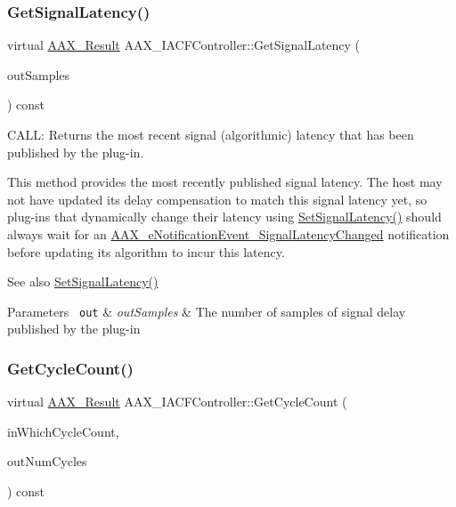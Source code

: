 \subsubsection{\texorpdfstring{GetSignalLatency()}{GetSignalLatency()}}
{\footnotesize\ttfamily virtual \mbox{\hyperlink{a00392_a4d8f69a697df7f70c3a8e9b8ee130d2f}{A\+A\+X\+\_\+\+Result}} A\+A\+X\+\_\+\+I\+A\+C\+F\+Controller\+::\+Get\+Signal\+Latency (\begin{DoxyParamCaption}\item[{int32\+\_\+t $\ast$}]{out\+Samples }\end{DoxyParamCaption}) const\hspace{0.3cm}{\ttfamily [pure virtual]}}



C\+A\+LL\+: Returns the most recent signal (algorithmic) latency that has been published by the plug-\/in. 

This method provides the most recently published signal latency. The host may not have updated its delay compensation to match this signal latency yet, so plug-\/ins that dynamically change their latency using \mbox{\hyperlink{a01789_af2c648879419d94971c1308d8698601f}{Set\+Signal\+Latency()}} should always wait for an \mbox{\hyperlink{a00491_afab5ea2cfd731fc8f163b6caa685406ea06ab4b075ecb523d0dde3ec19b76a756}{A\+A\+X\+\_\+e\+Notification\+Event\+\_\+\+Signal\+Latency\+Changed}} notification before updating its algorithm to incur this latency.

\begin{DoxySeeAlso}{See also}
\mbox{\hyperlink{a01789_af2c648879419d94971c1308d8698601f}{Set\+Signal\+Latency()}}
\end{DoxySeeAlso}

\begin{DoxyParams}[1]{Parameters}
\mbox{\texttt{ out}}  & {\em out\+Samples} & The number of samples of signal delay published by the plug-\/in \\
\hline
\end{DoxyParams}
\mbox{\label{a01637_a37c235cb6a27eab95686a009edeffabe}} 
\subsubsection{\texorpdfstring{GetCycleCount()}{GetCycleCount()}}
{\footnotesize\ttfamily virtual \mbox{\hyperlink{a00392_a4d8f69a697df7f70c3a8e9b8ee130d2f}{A\+A\+X\+\_\+\+Result}} A\+A\+X\+\_\+\+I\+A\+C\+F\+Controller\+::\+Get\+Cycle\+Count (\begin{DoxyParamCaption}\item[{\mbox{\hyperlink{a00662_a13e384f22825afd3db6d68395b79ce0d}{A\+A\+X\+\_\+\+E\+Property}}}]{in\+Which\+Cycle\+Count,  }\item[{\mbox{\hyperlink{a00392_ab247c0d8686c14e05cbb567ef276f249}{A\+A\+X\+\_\+\+C\+Property\+Value}} $\ast$}]{out\+Num\+Cycles }\end{DoxyParamCaption}) const\hspace{0.3cm}{\ttfamily [pure virtual]}}




